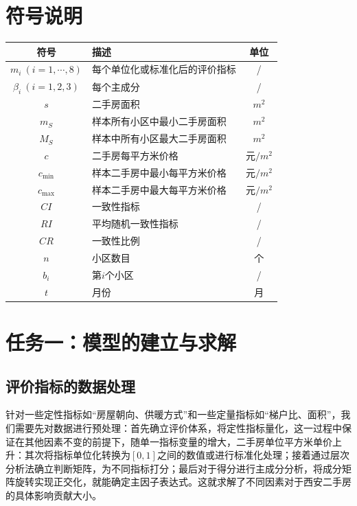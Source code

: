 \documentclass[withoutpreface,bwprint]{cumcmthesis} %
\begin{document}
\section{符号说明}
\begin{table}[H]
    \centering\small
    \begin{tabular}{cp{8cm}<{\centering}c}
    \toprule
    符号 & 描述 & 单位\\
    \midrule
        $m_i\ (i=1,\cdots,8)$ & 每个单位化或标准化后的评价指标 & / \\
        $\beta_i\ (i=1,2,3)$ & 每个主成分 & /\\
        $s$ & 二手房面积 & $m^2$\\
        $m_S$ & 样本所有小区中最小二手房面积 & $m^2$\\
        $M_S$ & 样本中所有小区最大二手房面积 & $m^2$\\
        $c$ & 二手房每平方米价格 & 元$/m^2$\\
        $c_{\min}$ & 样本二手房中最小每平方米价格 &元$/m^2$\\
        $c_{\max}$ & 样本二手房中最大每平方米价格 & 元$/m^2$\\
        $CI$ & 一致性指标 & /\\
        $RI$ & 平均随机一致性指标 & /\\
        $CR$ & 一致性比例 & /\\
        $n$ & 小区数目 & 个\\
        $b_i$ & 第$i$个小区 & /\\
        $t$ & 月份 & 月\\
    \bottomrule
    \end{tabular}
\end{table}
\section{任务一：模型的建立与求解}

\subsection{评价指标的数据处理}
针对一些定性指标如“房屋朝向、供暖方式”和一些定量指标如“梯户比、面积”，我们需要先对数据进行预处理：首先确立评价体系，将定性指标量化，这一过程中保证在其他因素不变的前提下，随单一指标变量的增大，二手房单位平方米单价上升：其次将指标单位化转换为$[0,1]$之间的数值或进行标准化处理；接着通过层次分析法确立判断矩阵，为不同指标打分；最后对于得分进行主成分分析，将成分矩阵旋转实现正交化，就能确定主因子表达式。这就求解了不同因素对于西安二手房的具体影响贡献大小。
\end{document}
